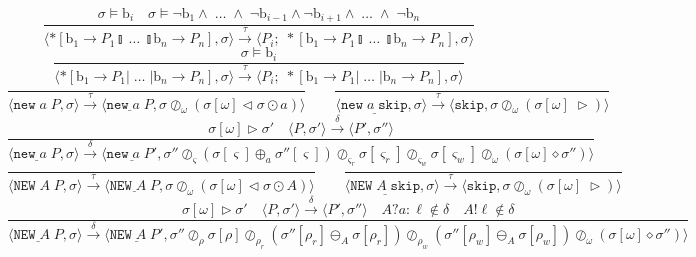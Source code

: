 \documentclass[times,10pt]{article}
\begin{document}
$$    \frac{\sigma \models \textrm{b}_i \quad \sigma \models \lnot \mathrm{b}_1 \wedge \; \ldots \; \wedge \; \lnot \mathrm{b}_{i-1} \wedge \lnot \mathrm{b}_{i+1} \wedge \; \ldots \; \wedge \; \lnot\mathrm{b}_n } {\langle *[ \mathrm{b}_1 \rightarrow P_1  \talloblong \; \ldots \; \talloblong \mathrm{b}_n \rightarrow P_n ] , \sigma \rangle \xrightarrow{\tau} \langle P_i; \; *[ \mathrm{b}_1 \rightarrow P_1  \talloblong \; \ldots \; \talloblong \mathrm{b}_n \rightarrow P_n ] , \sigma\rangle  } $$$$
    \frac{\sigma \models \textrm{b}_i} {\langle *[ \mathrm{b}_1 \rightarrow P_1  | \; \ldots \; | \mathrm{b}_n \rightarrow P_n ] , \sigma \rangle \xrightarrow{\tau} \langle P_i;\;*[ \mathrm{b}_1 \rightarrow P_1  | \; \ldots \; | \mathrm{b}_n \rightarrow P_n ] , \sigma\rangle  } $$$$
    \frac{}{\langle \mathtt{new} \; a \; P, \sigma \rangle \xrightarrow{\tau} \langle \underline{\mathtt{new} \; a \; P}, \sigma \oslash_\omega (\sigma[\omega] \triangleleft \sigma \odot a) \rangle} \qquad
    \frac{}{\langle \underline{\mathtt{new} \; a \; \mathtt{skip}}, \sigma \rangle \xrightarrow{\tau} \langle \mathtt{skip}, \sigma \oslash_\omega (\sigma[\omega] \; \triangleright) \rangle} $$$$
    \frac{\sigma[\omega] \triangleright \sigma' \quad \langle P, \sigma' \rangle \xrightarrow{\delta} \langle P', \sigma'' \rangle}{\langle \underline{\mathtt{new} \; a \; P}, \sigma \rangle \xrightarrow{\delta} \langle \underline{\mathtt{new} \; a \; P'}, \sigma'' \oslash_\varsigma (\sigma[\varsigma] \oplus_a \sigma''[\varsigma]) \oslash_{\varsigma_r} \sigma[\varsigma_r] \oslash_{\varsigma_w} \sigma[\varsigma_w] \oslash_\omega (\sigma[\omega] \diamond \sigma'') \rangle} $$$$
    \frac{}{\langle \mathtt{NEW} \; A \; P, \sigma \rangle \xrightarrow{\tau} \langle \underline{\mathtt{NEW} \; A \; P}, \sigma \oslash_\omega (\sigma[\omega] \triangleleft \sigma \odot A) \rangle} \qquad
    \frac{}{\langle \underline{\mathtt{NEW} \; A \; \mathtt{skip}}, \sigma \rangle \xrightarrow{\tau} \langle \mathtt{skip}, \sigma \oslash_\omega (\sigma[\omega] \; \triangleright) \rangle} $$$$
    \frac{\sigma[\omega] \triangleright \sigma' \quad \langle P, \sigma' \rangle \xrightarrow{\delta} \langle P', \sigma'' \rangle \quad A?a : \ell \notin \delta \quad A!\ell \notin \delta}{\langle \underline{\mathtt{NEW} \; A \; P}, \sigma \rangle \xrightarrow{\delta} \langle \underline{\mathtt{NEW} \; A \; P'}, \sigma'' \oslash_\rho \sigma[\rho] \oslash_{\rho_r} (\sigma''[\rho_r] \ominus_A \sigma[\rho_r]) \oslash_{\rho_w} (\sigma''[\rho_w] \ominus_A \sigma[\rho_w]) \oslash_\omega (\sigma[\omega] \diamond \sigma'') \rangle} $$$$
$$
\end{document}
